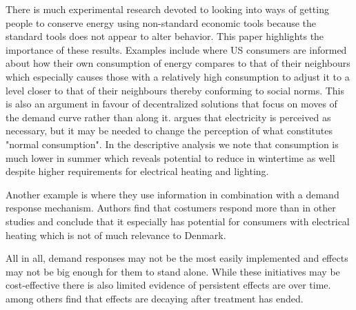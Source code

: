 There is much experimental research devoted to looking into ways of getting people to conserve energy using non-standard economic tools because the standard tools does not appear to alter behavior. This paper highlights the importance of these results. Examples include \citet{allcott2011social} where US consumers are informed about how their own consumption of energy compares to that of their neighbours which especially causes those with a relatively high consumption to adjust it to a level closer to that of their neighbours thereby conforming to social norms. This is also an argument in favour of decentralized solutions that focus on moves of the demand curve rather than along it. \citet{kirschen2003demand} argues that electricity is perceived as necessary, but it may be needed to change the perception of what constitutes "normal consumption". In the descriptive analysis we note that consumption is much lower in summer which reveals potential to reduce in wintertime as well despite higher requirements for electrical heating and lighting. 
\par Another example is \citet{saele2011demand} where they use information in combination with a demand response mechanism. Authors find that costumers respond more than in other studies and conclude that it especially has potential for consumers with electrical heating which is not of much relevance to Denmark.\bigskip

All in all, demand responses may not be the most easily implemented and effects may not be big enough for them to stand alone. While these initiatives may be cost-effective there is also limited evidence of persistent effects are over time. \citet{allcott2014short} among others find that effects are decaying after treatment has ended.

